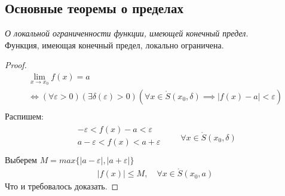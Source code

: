 \subsection{Основные теоремы о пределах}

\begin{theorem}
  \textit{О локальной ограниченности функции, имеющей конечный предел}. \\
  Функция, имеющая конечный предел, локально ограничена.
\end{theorem}
\begin{proof}
  \begin{gather*}
    \lim_{x \to x_0} f(x) = a \\
    \iff (\forall \varepsilon > 0)(\exists \delta(\varepsilon) > 0) (\forall x \in \mathring{S}(x_0, \delta) \implies |f(x) - a| < \varepsilon) \\
  \end{gather*}
  Распишем:
  \begin{gather*}
    \begin{matrix}
      - \varepsilon < f(x) - a < \varepsilon \\
      a - \varepsilon < f(x) < a + \varepsilon \\
    \end{matrix}
    \qquad
    \forall  x \in \mathring{S}(x_0, \delta)
  \end{gather*}
  Выберем $M = max\{|a - \varepsilon|, |a + \varepsilon|\}$ 
  \begin{gather*}
    |f(x)| \le  M, \quad \forall  x \in  \mathring{S}(x_0, a)
  \end{gather*}
  Что и требовалось доказать.
\end{proof}

